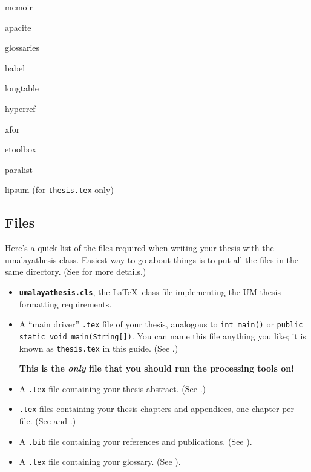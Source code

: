 \documentclass[a4paper,12pt]{scrartcl}
\begin{document}
\begin{minipage}{.8\textwidth}
\begin{multicols}{3}
\begin{compactitem}
\item \textsf{memoir}
\item \textsf{apacite}
\item \textsf{glossaries}
\item \textsf{babel}
\item \textsf{longtable}
\item \textsf{hyperref}
\item \textsf{xfor}
\item \textsf{etoolbox}
\item \textsf{paralist}
\item \textsf{lipsum} (for \texttt{thesis.tex} only)\raggedright
\end{compactitem}
\end{multicols}
\end{minipage}


\subsection{Files}\label{sec:files}
Here's a quick list of the files required when writing your thesis with the \textsf{umalayathesis} class. Easiest way to go about things is to put all the files in the same directory. (See  for more details.)
%
\begin{itemize}
\item \texttt{\bfseries umalayathesis.cls}, the \LaTeX\ class file implementing the \gls{UM} thesis formatting requirements.
\item A ``main driver'' \texttt{.tex} file of your thesis, analogous to \lstinline|int main()| or \lstinline|public static void main(String[])|. You can name this file anything you like; it is known as \texttt{thesis.tex} in this guide. (See .) \par\textbf{This is the \emph{only} file that you should run the processing tools on!}
\item A \texttt{.tex} file containing your thesis abstract. (See .)
\item \texttt{.tex} files containing your thesis chapters and appendices, one chapter per file. (See  and .)
\item A \texttt{.bib} file containing your references and  publications. (See ).
\item A \texttt{.tex} file containing your glossary. (See ).
\end{itemize}
\end{document}
